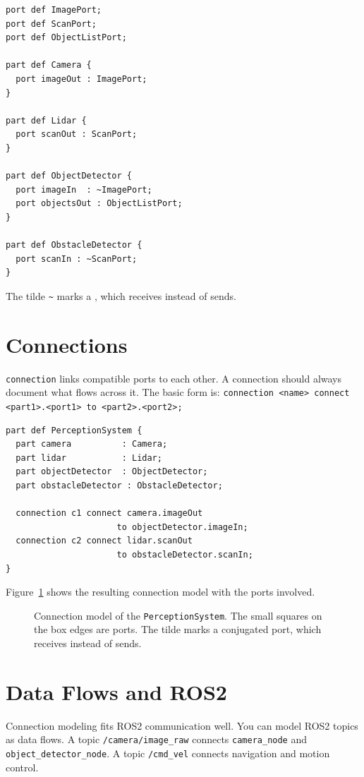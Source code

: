 \begin{lstlisting}
port def ImagePort;
port def ScanPort;
port def ObjectListPort;

part def Camera {
  port imageOut : ImagePort;
}

part def Lidar {
  port scanOut : ScanPort;
}

part def ObjectDetector {
  port imageIn  : ~ImagePort;
  port objectsOut : ObjectListPort;
}

part def ObstacleDetector {
  port scanIn : ~ScanPort;
}
\end{lstlisting}

The tilde \texttt{\textasciitilde} marks a , which receives instead of sends.

\section{Connections}
\texttt{connection} links compatible ports to each other. A connection should always document what flows across it. The basic form is: \texttt{connection <name> connect <part1>.<port1> to <part2>.<port2>;}

\begin{lstlisting}
part def PerceptionSystem {
  part camera          : Camera;
  part lidar           : Lidar;
  part objectDetector  : ObjectDetector;
  part obstacleDetector : ObstacleDetector;

  connection c1 connect camera.imageOut
                      to objectDetector.imageIn;
  connection c2 connect lidar.scanOut
                      to obstacleDetector.scanIn;
}
\end{lstlisting}

Figure~\ref{fig:ports-connections} shows the resulting connection model with the ports involved.

\begin{figure}[H]
  \centering
  \caption{Connection model of the \texttt{PerceptionSystem}. The small
    squares on the box edges are ports. The tilde marks a conjugated
    port, which receives instead of sends.}
  \label{fig:ports-connections}
\end{figure}

\section{Data Flows and ROS2}
Connection modeling fits ROS2 communication well. You can model ROS2 topics as data flows. A topic \texttt{/camera/image\_raw} connects \texttt{camera\_node} and \texttt{object\_detector\_node}. A topic \texttt{/cmd\_vel} connects navigation and motion control.

